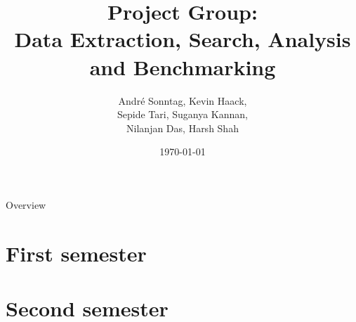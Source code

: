 \documentclass{beamer}
\title{Project Group:\\Data Extraction, Search, Analysis and Benchmarking}
\author{André Sonntag, Kevin Haack,\\Sepide Tari, Suganya Kannan,\\Nilanjan Das, Harsh Shah}
\institute{Paderborn University}
\date{\today}
\begin{document}
\begin{frame}
  \titlepage
\end{frame}

\begin{frame}{Overview}
\tableofcontents
\end{frame}



\section{First semester}











\section{Second semester}














\end{document}
